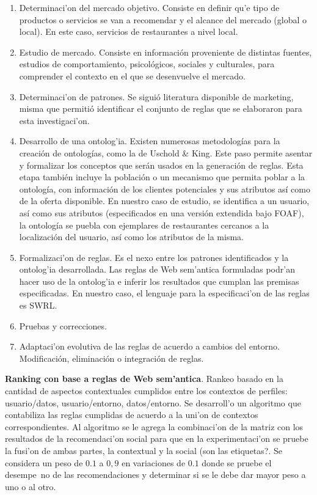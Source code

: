 \documentclass[11pt]{article}
\begin{document}
\begin{enumerate}
\item Determinaci'on del mercado objetivo. Consiste en definir qu'e tipo de productos o servicios se van a recomendar y el alcance del mercado (global o local). En este caso, servicios de restaurantes a nivel local.
\item Estudio de mercado. Consiste en información proveniente de distintas fuentes, estudios de comportamiento, psicológicos, sociales y culturales, para comprender el contexto en el que se desenvuelve el mercado.
\item Determinaci'on de patrones. Se siguió literatura disponible de marketing, misma que permitió identificar el conjunto de reglas que se elaboraron para esta investigaci'on.
\item Desarrollo de una ontolog'ia. Existen numerosas metodologías para la creación de ontologías, como la de Uschold \& King. Este paso permite asentar y formalizar los conceptos que serán usados en la generación de reglas. Esta etapa también incluye la población o un mecanismo que permita poblar a la ontología, con
información de los clientes potenciales y sus atributos así como de la oferta disponible. En nuestro caso de estudio, se identifica a un usuario, así como sus atributos (especificados en una versión extendida bajo FOAF), la ontología
se puebla con ejemplares de restaurantes cercanos a la localización del usuario, así como los atributos de la misma.

\item Formalizaci'on de reglas. Es el nexo entre los patrones identificados y la ontolog'ia desarrollada. Las reglas de Web sem'antica formuladas podr'an hacer uso de la ontolog'ia e inferir los resultados que cumplan las premisas especificadas. En nuestro caso, el lenguaje para la especificaci'on de las reglas es SWRL.
\item Pruebas y correcciones.
\item Adaptaci'on evolutiva de las reglas de acuerdo a cambios del entorno. Modificación, eliminación o integración de reglas.

\end{enumerate}

\textbf{Ranking con base a reglas de Web sem'antica}. Rankeo basado en la cantidad de aspectos contextuales cumplidos entre los contextos de perfiles: usuario/datos, usuario/entorno, datos/entorno. Se desarroll'o un algoritmo que contabiliza las reglas cumplidas de acuerdo a la uni'on de contextos correspondientes. Al algoritmo se le agrega la combinaci'on de la matriz con los resultados de la recomendaci'on social para que en la experimentaci'on se pruebe la fusi'on de ambas partes, la contextual y la social (son las etiquetas?. Se considera un peso de $0.1$ a $0,9$ en variaciones de $0.1$ donde se pruebe el desempe~no de las recomendaciones y determinar si se le debe dar mayor peso a uno o al otro.
\end{document}
